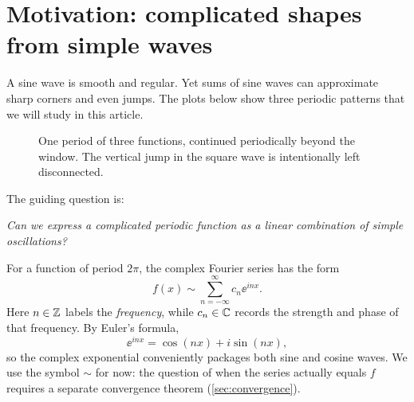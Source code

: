 
\section{Motivation: complicated shapes from simple waves}
A sine wave is smooth and regular. Yet sums of sine waves can approximate sharp
corners and even jumps. The plots below show three periodic patterns that we will
study in this article.

\begin{figure}[htbp]
\centering
{}
\caption{One period of three functions, continued periodically beyond the window.
The vertical jump in the square wave is intentionally left disconnected.}
\label{fig:three-waves}
\end{figure}

The guiding question is:
\begin{center}
\emph{Can we express a complicated periodic function as a linear combination of simple oscillations?}
\end{center}

For a function of period $2\pi$, the complex Fourier series has the form
\begin{equation}\label{eq:fourier-proposal}
 f(x)\sim\sum_{n=-\infty}^{\infty}c_n\ee^{inx}.
\end{equation}
Here $n\in\mathbb{Z}$ labels the \emph{frequency}, while $c_n\in\mathbb{C}$ records the
strength and phase of that frequency. By Euler's formula,
\[
 \ee^{inx}=\cos(nx)+i\sin(nx),
\]
so the complex exponential conveniently packages both sine and cosine waves.
We use the symbol $\sim$ for now: the question of when the series actually equals
$f$ requires a separate convergence theorem (\cref{sec:convergence}).

